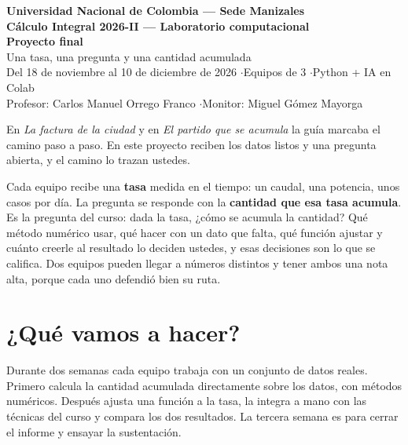 \documentclass[12pt,letterpaper]{article}
\newcommand{\monitor}{Miguel Gómez Mayorga}
\begin{document}
\begin{center}
    {\Large \textbf{Universidad Nacional de Colombia --- Sede Manizales}}\\
    {\large \textbf{Cálculo Integral 2026-II --- Laboratorio computacional}}\\[0.8em]
    {\LARGE \textbf{Proyecto final}}\\[0.4em]
    {\large Una tasa, una pregunta y una cantidad acumulada}\\[0.5em]
    {\normalsize Del 18 de noviembre al 10 de diciembre de 2026 \quad$\cdot$\quad Equipos de 3 \quad$\cdot$\quad Python + IA en Colab}\\
    {\normalsize Profesor: Carlos Manuel Orrego Franco \quad$\cdot$\quad Monitor: \monitor}
\end{center}

\begin{cajabitacora}
En \emph{La factura de la ciudad} y en \emph{El partido que se acumula} la guía marcaba el camino paso a paso. En este proyecto reciben los datos listos y una pregunta abierta, y el camino lo trazan ustedes.

Cada equipo recibe una \textbf{tasa} medida en el tiempo: un caudal, una potencia, unos casos por día. La pregunta se responde con la \textbf{cantidad que esa tasa acumula}. Es la pregunta del curso: dada la tasa, ¿cómo se acumula la cantidad? Qué método numérico usar, qué hacer con un dato que falta, qué función ajustar y cuánto creerle al resultado lo deciden ustedes, y esas decisiones son lo que se califica. Dos equipos pueden llegar a números distintos y tener ambos una nota alta, porque cada uno defendió bien su ruta.
\end{cajabitacora}

\section{¿Qué vamos a hacer?}
Durante dos semanas cada equipo trabaja con un conjunto de datos reales. Primero calcula la cantidad acumulada directamente sobre los datos, con métodos numéricos. Después ajusta una función a la tasa, la integra a mano con las técnicas del curso y compara los dos resultados. La tercera semana es para cerrar el informe y ensayar la sustentación.
\end{document}
